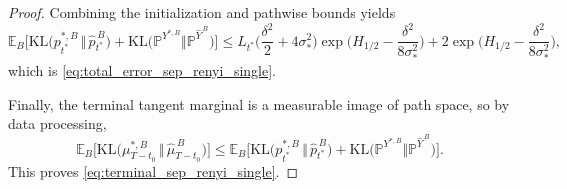\documentclass[twoside,11pt]{article}
\newcommand{\E}{\mathbb{E}}
\newcommand{\PP}{\mathbb{P}}
\newcommand{\KL}{\mathrm{KL}}
\numberwithin{equation}{section}
\begin{document}
\begin{proof}
Combining the initialization and pathwise bounds yields
\[
\E_B\!\Big[
\KL\!\big(p_{t^*}^{*,B}\,\Vert\,\hat p_{t^*}^{\,B}\big)
+
\KL\!\big(\PP^{Y^{*,B}}\Vert \PP^{\hat Y^{\,B}}\big)
\Big]
\le
L_{t^*}\Big(\frac{\delta^2}{2}+4\sigma_*^2\Big)
\exp\!\Big(H_{1/2}-\frac{\delta^2}{8\sigma_*^2}\Big)
+
2\exp\!\Big(H_{1/2}-\frac{\delta^2}{8\sigma_*^2}\Big),
\]
which is \eqref{eq:total_error_sep_renyi_single}.

Finally, the terminal tangent marginal is a measurable image of path space, so by data
processing,
\[
\E_B\!\Big[
\KL\!\big(\mu_{T-t_0}^{*,B}\,\Vert\,\hat\mu_{T-t_0}^{\,B}\big)
\Big]
\le
\E_B\!\Big[
\KL\!\big(p_{t^*}^{*,B}\,\Vert\,\hat p_{t^*}^{\,B}\big)
+
\KL\!\big(\PP^{Y^{*,B}}\Vert \PP^{\hat Y^{\,B}}\big)
\Big].
\]
This proves \eqref{eq:terminal_sep_renyi_single}.
\end{proof}


\end{document}
